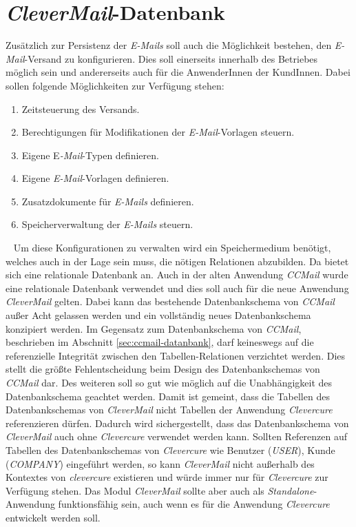\section{\emph{CleverMail}-Datenbank}
Zusätzlich zur Persistenz der \emph{E-Mails} soll auch die Möglichkeit bestehen, den \emph{E-Mail}-Versand zu konfigurieren. Dies soll einerseits innerhalb des Betriebes möglich sein und andererseits auch für die AnwenderInnen der KundInnen. Dabei sollen folgende Möglichkeiten zur Verfügung stehen:
\begin{enumerate}
	\item Zeitsteuerung des Versands.
	\item Berechtigungen für Modifikationen der \emph{E-Mail}-Vorlagen steuern.
	\item Eigene E\emph{-Mail}-Typen definieren.
	\item Eigene \emph{E-Mail}-Vorlagen definieren.
	\item Zusatzdokumente für \emph{E-Mails} definieren. 
	\item Speicherverwaltung der \emph{E-Mails} steuern.
\end{enumerate}
\ \newline
Um diese Konfigurationen zu verwalten wird ein Speichermedium benötigt, welches auch in der Lage sein muss, die nötigen Relationen abzubilden. Da bietet sich eine relationale Datenbank an. Auch in der alten Anwendung \emph{CCMail} wurde eine relationale Datenbank verwendet und dies soll auch für die neue Anwendung \emph{CleverMail} gelten. Dabei kann das bestehende Datenbankschema von \emph{CCMail} außer Acht gelassen werden und ein vollständig neues Datenbankschema konzipiert werden. 
\newline
\newline
Im Gegensatz zum Datenbankschema von \emph{CCMail}, beschrieben im Abschnitt \ref{sec:ccmail-datanbank}, darf keineswegs auf die referenzielle Integrität zwischen den Tabellen-Relationen verzichtet werden. Dies stellt die größte Fehlentscheidung beim Design des Datenbankschemas von \emph{CCMail} dar. Des weiteren soll so gut wie möglich auf die Unabhängigkeit des Datenbankschema geachtet werden. Damit ist gemeint, dass die Tabellen des Datenbankschemas von \emph{CleverMail} nicht Tabellen der Anwendung \emph{Clevercure} referenzieren dürfen. Dadurch wird sichergestellt, dass das Datenbankschema von \emph{CleverMail} auch ohne \emph{Clevercure} verwendet werden kann. Sollten Referenzen auf Tabellen des Datenbankschemas von \emph{Clevercure} wie Benutzer (\emph{USER}), Kunde (\emph{COMPANY}) eingeführt werden, so kann \emph{CleverMail} nicht außerhalb des Kontextes von \emph{clevercure} existieren und würde immer nur für \emph{Clevercure} zur Verfügung stehen. Das Modul \emph{CleverMail} sollte aber auch als \emph{Standalone}-Anwendung funktionsfähig sein, auch wenn es für die Anwendung \emph{Clevercure} entwickelt werden soll. 
